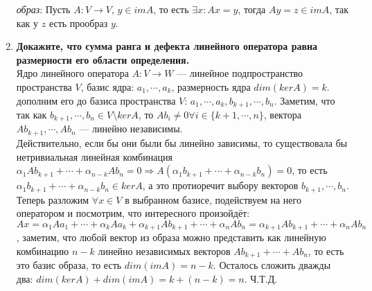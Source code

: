 \documentclass[12pt]{article} %
\begin{document}
\begin{enumerate}
    \textit{образ}: Пусть $A: V \rightarrow V$, $y \in imA$, то есть $\exists x: Ax = y$, тогда $Ay = z \in imA$, так как у $z$ есть прообраз $y$.
    
    \item \textbf{Докажите, что сумма ранга и дефекта линейного оператора равна размерности его области определения.}\\

    Ядро линейного оператора $A: V \rightarrow W$ --- линейное подпространство пространства $V$, базис ядра: $a_1, \cdots, a_k$, размерность ядра $dim(kerA) = k$. дополним его до базиса пространства $V$: $a_1, \cdots, a_k, b_{k + 1}, \cdots, b_n$. Заметим, что так как $b_{k + 1}, \cdots, b_n \in V \setminus kerA$, то $Ab_i \neq 0 \forall i \in \{k + 1, \cdots, n\}$, вектора $Ab_{k + 1}, \cdots, Ab_n$ --- линейно независимы.\\ Действительно, если бы они были бы линейно зависимы, то существовала бы нетривиальная линейная комбинация $\alpha_1 Ab_{k + 1} + \cdots + \alpha_{n - k} A b_n = 0 \Rightarrow A(\alpha_1 b_{k + 1} + \cdots + \alpha_{n - k} b_n) = 0$, то есть $\alpha_1 b_{k + 1} + \cdots + \alpha_{n - k} b_n \in kerA$, а это протиоречит выбору векторов $b_{k + 1}, \cdots, b_n$. Теперь разложим $\forall x \in V$ в выбранном базисе, подействуем на него оператором и посмотрим, что интересного произойдёт: $Ax = \alpha_1 Aa_1 + \cdots + \alpha_k Aa_k + \alpha_{k + 1}Ab_{k + 1} + \cdots + \alpha_nAb_n = \alpha_{k + 1}Ab_{k + 1} + \cdots + \alpha_nAb_n$, заметим, что любой вектор из образа можно представить как линейную комбинацию $n - k$ линейно независимых векторов $Ab_{k + 1} + \cdots + Ab_n$, то есть это базис образа, то есть $dim(imA) = n - k$. Осталось сложить дважды два: $dim(kerA) + dim(imA) = k + (n - k) = n$. Ч.Т.Д.
    

\end{enumerate}
\end{document}

